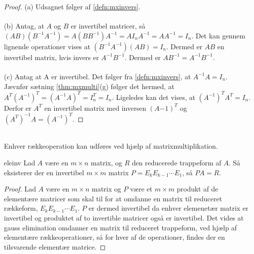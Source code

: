 %
%
\begin{proof}
(a)
Udsagnet følger af \ref{defn:mxinvers}. 
\\\\
(b) Antag, at $A$ og $B$ er invertibel matricer, så $(AB)(B^{-1}A^{-1})=A(BB^{-1})A^{-1}=AI_nA^{-1}=AA^{-1}=I_n$. 
Det kan gennem lignende operationer vises at $(B^{-1}A^{-1})(AB)=I_n$.
Dermed er $AB$ en invertibel matrix, hvis invers er $A^{-1}B^{-1}$.
Dermed er $AB^{-1}=A^{-1}B^{-1}$.
\\\\
(c) Antag at A er invertibel. 
Det følger fra \ref{defn:mxinvers}, at $A^{-1}A=I_n$. 
Jævnfør sætning \ref{thm:mxmulti}(g) følger det hermed, at $A^T(A^{-1})^T=(A^{-1}A)^T=I_n^T=I_n$. 
Ligeledes kan det vises, at $(A^{-1})^TA^T=I_n$. 
Derfor er $A^T$ en invertibel matrix med inversen $(A{-1})^T$ og $(A^T)^{-1}A=(A^{-1})^T$.
\end{proof}\\
%
%
Enhver rækkeoperation kan udføres ved hjælp af matrixmultiplikation.
\begin{thm}{}{eleinv}
Lad $A$ være en $m \times n$ matrix, og $R$ den reducerede trappeform af $A$. 
Så eksisterer der en invertibel $m \times m$ matrix $P=E_kE_{k-1} \cdots E_1$, så $PA=R$.
\end{thm}
\begin{proof}
Lad $A$ være en $m \times n$ matrix og $P$ være et $m \times m$ produkt af de elementære matricer som skal til for at omdanne en matrix til reduceret rækkeform, $E_kE_{k-1} \cdots E_1$. 
$P$ er dermed invertibel da enhver elemenetær matrix er invertibel og produktet af to invertible matricer også er invertibel. 
Det vides at gauss elimination omdanner en matrix til reduceret trappeform, ved hjælp af elementære rækkeoperationer, så for hver af de operationer, findes der en tilsvarende elementær matrice.

\end{proof}
